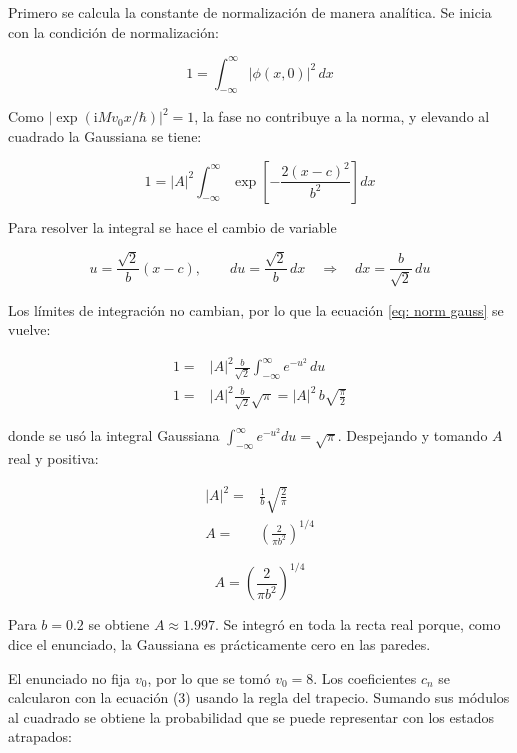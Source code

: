 Primero se calcula la constante de normalización de manera analítica. Se inicia con la condición de normalización:

\begin{equation}
    1 = \int_{-\infty}^{\infty}|\phi(x,0)|^2\,dx
\end{equation}

Como $|\exp(\mathrm{i}Mv_0x/\hbar)|^2 = 1$, la fase no contribuye a la norma, y elevando al cuadrado la Gaussiana se tiene:

\begin{equation}
    1 = |A|^2\int_{-\infty}^{\infty}\exp\left[-\frac{2(x-c)^2}{b^2}\right]dx
    \label{eq: norm gauss}
\end{equation}

Para resolver la integral se hace el cambio de variable

\begin{equation*}
    u=\frac{\sqrt{2}}{b}(x-c), \qquad du=\frac{\sqrt{2}}{b}\,dx \quad\Rightarrow\quad dx=\frac{b}{\sqrt{2}}\,du
\end{equation*}

Los límites de integración no cambian, por lo que la ecuación \ref{eq: norm gauss} se vuelve:

\begin{align}
    1 =& |A|^2\frac{b}{\sqrt{2}}\int_{-\infty}^{\infty}e^{-u^2}\,du \\
    1 =& |A|^2\frac{b}{\sqrt{2}}\sqrt{\pi} = |A|^2\,b\sqrt{\frac{\pi}{2}}
\end{align}

donde se usó la integral Gaussiana $\int_{-\infty}^{\infty}e^{-u^2}du=\sqrt{\pi}$. Despejando y tomando $A$ real y positiva:

\begin{align}
    |A|^2 =& \frac{1}{b}\sqrt{\frac{2}{\pi}} \\
    A =& \left(\frac{2}{\pi b^2}\right)^{1/4}
\end{align}

\begin{equation}
    \boxed{A=\left(\frac{2}{\pi b^2}\right)^{1/4}}
\end{equation}

Para $b=0.2$ se obtiene $A\approx1.997$. Se integró en toda la recta real porque, como dice el enunciado, la Gaussiana es prácticamente cero en las paredes.

El enunciado no fija $v_0$, por lo que se tomó $v_0=8$. Los coeficientes $c_n$ se calcularon con la ecuación (3) usando la regla del trapecio. Sumando sus módulos al cuadrado se obtiene la probabilidad que se puede representar con los estados atrapados:

